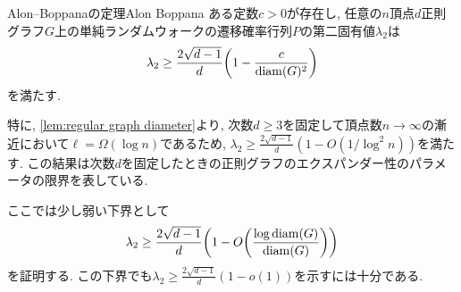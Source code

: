 \begin{theorem}{Alon--Boppanaの定理}{Alon Boppana}
    ある定数$c>0$が存在し, 任意の$n$頂点$d$正則グラフ$G$上の単純ランダムウォークの遷移確率行列$P$の第二固有値$\lambda_2$は
    \[ \lambda_2 \ge \frac{2\sqrt{d-1}}{d}\rbra*{ 1 - \frac{c}{\diam(G)^2}} \]
    を満たす.
\end{theorem}
特に, \cref{lem:regular graph diameter}より, 次数$d\ge 3$を固定して頂点数$n\to\infty$の漸近において$\ell = \Omega(\log n)$であるため, $\lambda_2 \ge \frac{2\sqrt{d-1}}{d} (1 - O(1/\log^2 n))$を満たす.
この結果は次数$d$を固定したときの正則グラフのエクスパンダー性のパラメータの限界を表している.

ここでは少し弱い下界として
\begin{align}
    \lambda_2 \ge \frac{2\sqrt{d-1}}{d}\rbra*{1 - O\rbra*{\frac{\log \diam(G)}{\diam(G)}}} \label{eq:weak alon boppana bound}
\end{align}
を証明する. この下界でも$\lambda_2 \ge \frac{2\sqrt{d-1}}{d}(1-o(1))$を示すには十分である.
